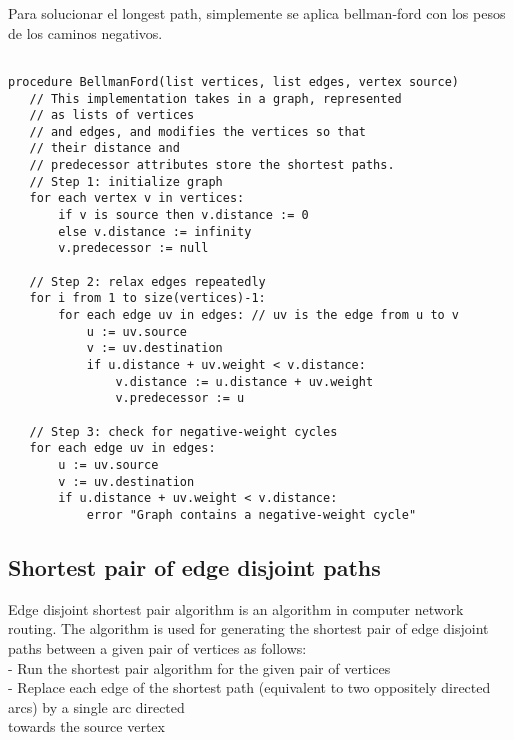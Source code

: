 \documentclass[10pt,letterpaper,twocolumn,twosided]{article}
\begin{document}
Para solucionar el longest path, simplemente se aplica bellman-ford con los pesos de los caminos negativos.
\begin{verbatim}

procedure BellmanFord(list vertices, list edges, vertex source)
   // This implementation takes in a graph, represented
   // as lists of vertices
   // and edges, and modifies the vertices so that 
   // their distance and
   // predecessor attributes store the shortest paths.
   // Step 1: initialize graph
   for each vertex v in vertices:
       if v is source then v.distance := 0
       else v.distance := infinity
       v.predecessor := null

   // Step 2: relax edges repeatedly
   for i from 1 to size(vertices)-1:
       for each edge uv in edges: // uv is the edge from u to v
           u := uv.source
           v := uv.destination
           if u.distance + uv.weight < v.distance:
               v.distance := u.distance + uv.weight
               v.predecessor := u

   // Step 3: check for negative-weight cycles
   for each edge uv in edges:
       u := uv.source
       v := uv.destination
       if u.distance + uv.weight < v.distance:
           error "Graph contains a negative-weight cycle"
\end{verbatim}

\subsection{Shortest pair of edge disjoint paths}

Edge disjoint shortest pair algorithm is an algorithm in computer network routing. The algorithm 
is used for generating the shortest pair of edge disjoint paths between a given pair of vertices as follows:\\

- Run the shortest pair algorithm for the given pair of vertices\\

- Replace each edge of the shortest path (equivalent to two oppositely directed arcs) by a single arc directed \\
towards the source vertex
\end{document}
